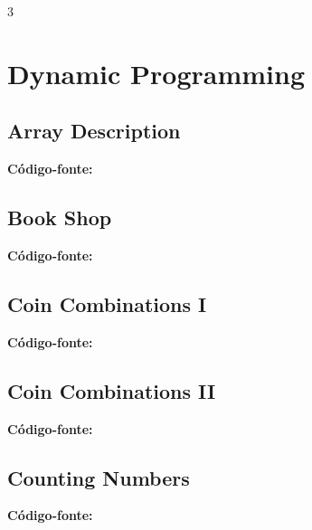 \documentclass[8pt]{extarticle}
\begin{document}
\begin{multicols*}{3}

\section{Dynamic Programming}

\subsection{Array Description}
\begin{caixaenunciado}

\end{caixaenunciado}
\vspace{0.3cm}
\noindent\textbf{Código-fonte:}


\subsection{Book Shop}
\begin{caixaenunciado}

\end{caixaenunciado}
\vspace{0.3cm}
\noindent\textbf{Código-fonte:}


\subsection{Coin Combinations I}
\begin{caixaenunciado}

\end{caixaenunciado}
\vspace{0.3cm}
\noindent\textbf{Código-fonte:}


\subsection{Coin Combinations II}
\begin{caixaenunciado}

\end{caixaenunciado}
\vspace{0.3cm}
\noindent\textbf{Código-fonte:}


\subsection{Counting Numbers}
\begin{caixaenunciado}

\end{caixaenunciado}
\vspace{0.3cm}
\noindent\textbf{Código-fonte:}



\end{multicols*}
\end{document}
